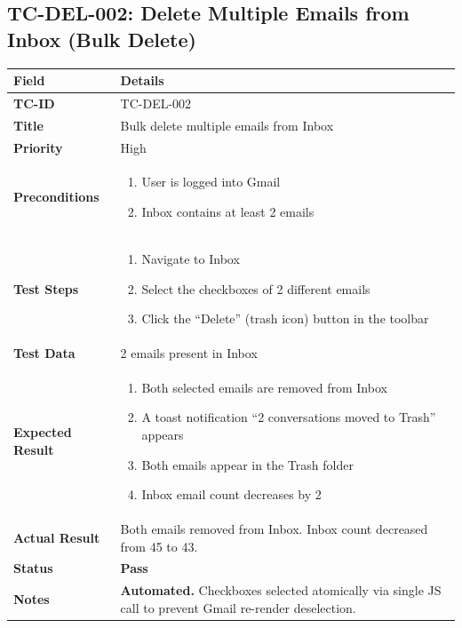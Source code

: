 \documentclass[12pt,a4paper]{article}
\begin{document}
\subsection{TC-DEL-002: Delete Multiple Emails from Inbox (Bulk Delete)}

\begin{longtable}{|L{3.5cm}|L{11.5cm}|}
\hline
{}\textbf{Field} & \textbf{Details} \\
\hline
\textbf{TC-ID}           & TC-DEL-002 \\
\hline
\textbf{Title}           & Bulk delete multiple emails from Inbox \\
\hline
\textbf{Priority}        & High \\
\hline
\textbf{Preconditions}   & \begin{enumerate}[noitemsep,topsep=0pt]
                              \item User is logged into Gmail
                              \item Inbox contains at least 2 emails
                            \end{enumerate} \\
\hline
\textbf{Test Steps}      & \begin{enumerate}[noitemsep,topsep=0pt]
                              \item Navigate to Inbox
                              \item Select the checkboxes of 2 different emails
                              \item Click the ``Delete'' (trash icon) button in the toolbar
                            \end{enumerate} \\
\hline
\textbf{Test Data}       & 2 emails present in Inbox \\
\hline
\textbf{Expected Result} & \begin{enumerate}[noitemsep,topsep=0pt]
                              \item Both selected emails are removed from Inbox
                              \item A toast notification ``2 conversations moved to Trash'' appears
                              \item Both emails appear in the Trash folder
                              \item Inbox email count decreases by 2
                            \end{enumerate} \\
\hline
\textbf{Actual Result}   & Both emails removed from Inbox. Inbox count decreased from 45 to 43. \\
\hline
\textbf{Status}          & \textcolor{passgreen}{\textbf{Pass}} \\
\hline
\textbf{Notes}           & \textbf{Automated.} Checkboxes selected atomically via single JS call to prevent Gmail re-render deselection. \\
\hline
\end{longtable}
\end{document}
